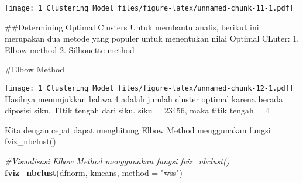 \documentclass[]{article}
\newenvironment{Shaded}{\begin{snugshade}}{\end{snugshade}}
\newcommand{\CommentTok}[1]{\textcolor[rgb]{0.56,0.35,0.01}{\textit{#1}}}
\newcommand{\ControlFlowTok}[1]{\textcolor[rgb]{0.13,0.29,0.53}{\textbf{#1}}}
\newcommand{\DataTypeTok}[1]{\textcolor[rgb]{0.13,0.29,0.53}{#1}}
\newcommand{\DecValTok}[1]{\textcolor[rgb]{0.00,0.00,0.81}{#1}}
\newcommand{\KeywordTok}[1]{\textcolor[rgb]{0.13,0.29,0.53}{\textbf{#1}}}
\newcommand{\NormalTok}[1]{#1}
\newcommand{\OperatorTok}[1]{\textcolor[rgb]{0.81,0.36,0.00}{\textbf{#1}}}
\newcommand{\OtherTok}[1]{\textcolor[rgb]{0.56,0.35,0.01}{#1}}
\newcommand{\StringTok}[1]{\textcolor[rgb]{0.31,0.60,0.02}{#1}}
\begin{document}
\texttt{[image: 1\_Clustering\_Model\_files/figure-latex/unnamed-chunk-11-1.pdf]}

\#\#Determining Optimal Clusters Untuk membantu analis, berikut ini
merupakan dua metode yang populer untuk menentukan nilai Optimal CLuter:
1. Elbow method 2. Silhouette method

\#Elbow Method

\begin{Shaded}
\end{Shaded}

\texttt{[image: 1\_Clustering\_Model\_files/figure-latex/unnamed-chunk-12-1.pdf]}
Hasilnya menunjukkan bahwa 4 adalah jumlah cluster optimal karena berada
diposisi siku. TItik tengah dari siku. siku = 23456, maka titik tengah =
4

Kita dengan cepat dapat menghitung Elbow Method menggunakan fungsi
fviz\_nbclust()

\begin{Shaded}
\begin{Highlighting}[]
\CommentTok{#Visualisasi Elbow Method menggunakan fungsi fviz_nbclust()}
\KeywordTok{fviz_nbclust}\NormalTok{(dfnorm, kmeans, }\DataTypeTok{method =} \StringTok{"wss"}\NormalTok{)}
\end{Highlighting}
\end{Shaded}
\end{document}
